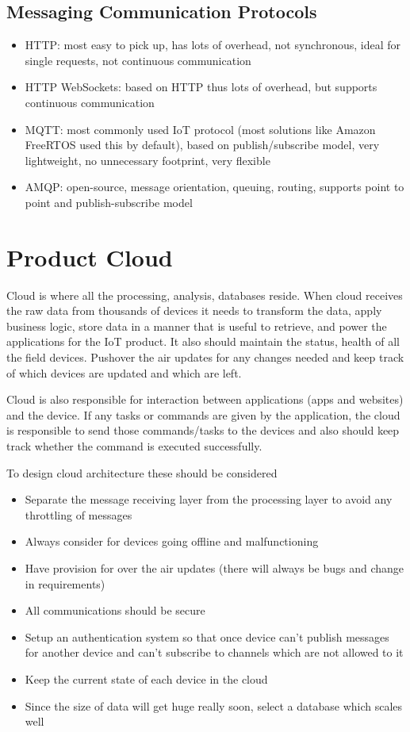 \documentclass[12pt]{report}
\begin{document}
\section{Messaging Communication Protocols}

\begin{itemize}
    \item HTTP: most easy to pick up, has lots of overhead, not synchronous, ideal for single requests, not continuous communication
    \item HTTP WebSockets: based on HTTP thus lots of overhead, but supports continuous communication
    \item MQTT: most commonly used IoT protocol (most solutions like Amazon FreeRTOS used this by default), based on publish/subscribe model, very lightweight, no unnecessary footprint, very flexible
    \item AMQP: open-source, message orientation, queuing, routing, supports point to point and publish-subscribe model
\end{itemize}

\chapter{Product Cloud}

Cloud is where all the processing, analysis, databases reside. When cloud receives the raw data from thousands of devices it needs to transform the data, apply business logic, store data in a manner that is useful to retrieve, and power the applications for the IoT product. It also should maintain the status, health of all the field devices. Pushover the air updates for any changes needed and keep track of which devices are updated and which are left.

Cloud is also responsible for interaction between applications (apps and websites) and the device. If any tasks or commands are given by the application, the cloud is responsible to send those commands/tasks to the devices and also should keep track whether the command is executed successfully.


To design cloud architecture these should be considered

\begin{itemize}
    \item Separate the message receiving layer from the processing layer to avoid any throttling of messages
    \item Always consider for devices going offline and malfunctioning
    \item Have provision for over the air updates (there will always be bugs and change in requirements)
    \item All communications should be secure
    \item Setup an authentication system so that once device can’t publish messages for another device and can’t subscribe to channels which are not allowed to it
    \item Keep the current state of each device in the cloud
    \item Since the size of data will get huge really soon, select a database which scales well
\end{itemize}
\end{document}
